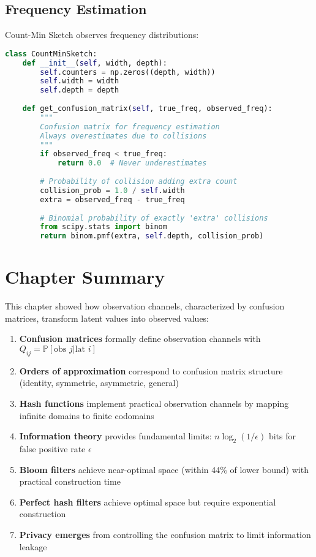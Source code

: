 \subsection{Frequency Estimation}

Count-Min Sketch observes frequency distributions:

\begin{lstlisting}[language=Python, caption={Count-Min Sketch confusion matrix}]
class CountMinSketch:
    def __init__(self, width, depth):
        self.counters = np.zeros((depth, width))
        self.width = width
        self.depth = depth
    
    def get_confusion_matrix(self, true_freq, observed_freq):
        """
        Confusion matrix for frequency estimation
        Always overestimates due to collisions
        """
        if observed_freq < true_freq:
            return 0.0  # Never underestimates
        
        # Probability of collision adding extra count
        collision_prob = 1.0 / self.width
        extra = observed_freq - true_freq
        
        # Binomial probability of exactly 'extra' collisions
        from scipy.stats import binom
        return binom.pmf(extra, self.depth, collision_prob)
\end{lstlisting}

\section{Chapter Summary}

This chapter showed how observation channels, characterized by confusion matrices, transform latent values into observed values:

\begin{enumerate}
\item \textbf{Confusion matrices} formally define observation channels with $Q_{ij} = \mathbb{P}[\text{obs } j | \text{lat } i]$

\item \textbf{Orders of approximation} correspond to confusion matrix structure (identity, symmetric, asymmetric, general)

\item \textbf{Hash functions} implement practical observation channels by mapping infinite domains to finite codomains

\item \textbf{Information theory} provides fundamental limits: $n\log_2(1/\epsilon)$ bits for false positive rate $\epsilon$

\item \textbf{Bloom filters} achieve near-optimal space (within 44\% of lower bound) with practical construction time

\item \textbf{Perfect hash filters} achieve optimal space but require exponential construction

\item \textbf{Privacy emerges} from controlling the confusion matrix to limit information leakage
\end{enumerate}

